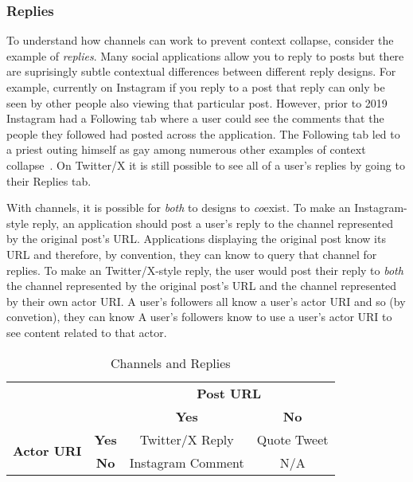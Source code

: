 
\subsubsection{Replies}

To understand how channels can work to prevent context collapse, consider the example of \emph{replies}.
Many social applications allow you to reply to posts but there are suprisingly subtle
contextual differences between different reply designs.
For example, currently on Instagram
if you reply to a post that reply can only be seen by other
people also viewing that particular post.
However, prior to 2019 Instagram had a Following tab where a user could see
the comments that the people they followed had posted across the application.
The Following tab led to a priest outing himself as gay among numerous other
examples of context collapse~\cite{instagramfollowingtab}.
On Twitter/X it is still possible to see all of a user's replies by going
to their Replies tab.

With channels, it is possible for \emph{both} to designs to \emph{co}exist.
To make an Instagram-style reply,
an application should post a user's reply to the channel
represented by the original post's URL.
Applications displaying the original post know its URL and therefore,
by convention, they can know to query that channel for replies.
To make an Twitter/X-style reply, the user would post their reply to \emph{both}
the channel represented by the original post's URL and
the channel represented by their own actor URI.
A user's followers all know a user's actor URI and so
(by convetion), they can know
A user's followers know to use a user's actor URI to see content related to that actor.

\begin{table}[htbp]
    \label{concepts:channel-replies}
    \begin{tabular}{c|c|c|c}
        \multicolumn{2}{c}{} & \multicolumn{2}{c}{\textbf{Post URL}} \\
        \multicolumn{2}{c|}{} & \textbf{Yes} & \textbf{No} \\
        \hline
        \multirow{2}{*}{\textbf{Actor URI}} & \textbf{Yes} & Twitter/X Reply & Quote Tweet \\
        \cline{2-4}
        & \textbf{No} & Instagram Comment & N/A \\
        \hline
    \end{tabular}
    \caption{Channels and Replies}
\end{table}

